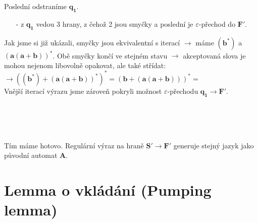 \documentclass{report}
\begin{document}
\begin{enumerate}
\begin{center}
\begin{tikzpicture} [node distance = 2cm, on grid, auto]
    \end{tikzpicture} \\ \\
    \end{center}
    Poslední odstraníme $\mathbf{q_1}$.
    \begin{itemize}
        \item[-] z $\mathbf{q_1}$ vedou 3 hrany, z čehož 2 jsou smyčky a poslední je $\varepsilon$-přechod do $\mathbf{F'}$.
    \end{itemize}
    Jak jsme si již ukázali, smyčky jsou ekvivalentní s iterací $\rightarrow$ máme $\mathbf{(b^*)}$ a $\mathbf{(a(a + b))^*}$. Obě smyčky končí ve stejném stavu $\rightarrow$ akceptovaná slova je mohou nejenom libovolně opakovat, ale také střídat:\\$\rightarrow \mathbf{((b^*)+(a(a+b))^*)^*=(b + (a(a+b)))^*=}$ \\ Vnější iterací výrazu jsme zároveň pokryli možnost $\varepsilon$-přechodu $\mathbf{q_1 \rightarrow F'}$.\\ \\
    \begin{center}
     \\ \\ 
    \end{center}
    Tím máme hotovo. Regulární výraz na hraně $\mathbf{S' \rightarrow F'}$ generuje stejný jazyk jako původní automat \textbf{A}.
    \end{enumerate}
    \section{Lemma o vkládání (Pumping lemma)}
\end{document}
